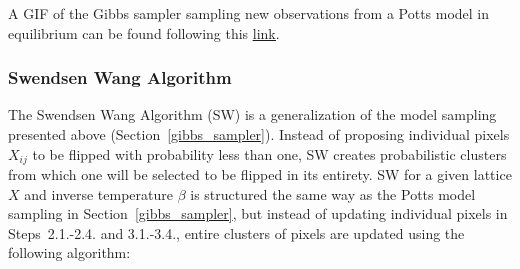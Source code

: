 \documentclass[12pt, twoside]{article}
\newcommand{\1}{\mathbb{1}}
\begin{document}

%
A GIF of the Gibbs sampler sampling new observations from a Potts model in equilibrium can be found following this \href{https://github.com/maierhofert/2DPottsModel/blob/master/plots/grid_Gibbs_equilibrium.gif}{\underline{link}}.

\subsubsection{Swendsen Wang Algorithm}\label{swendsen_wang}
The Swendsen Wang Algorithm (SW) is a generalization of the model sampling presented above (Section~\ref{gibbs_sampler}). Instead of proposing individual pixels $X_{ij}$ to be flipped with probability less than one, SW creates probabilistic clusters from which one will be selected to be flipped in its entirety. 
SW for a given lattice $X$ and inverse temperature $\beta$ is structured the same way as the Potts model sampling in Section~\ref{gibbs_sampler}, but instead of updating individual pixels in Steps~2.1.-2.4. and 3.1.-3.4., entire clusters of pixels are updated using the following algorithm:  \\
\end{document}
